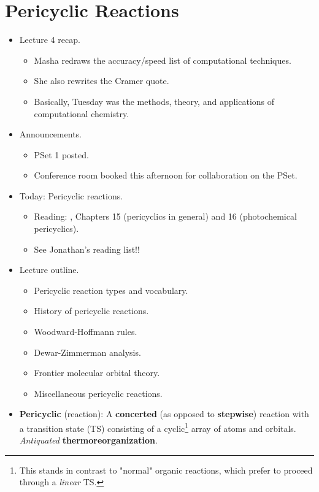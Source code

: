 \documentclass[../notes.tex]{subfiles}
\begin{document}
\section{Pericyclic Reactions}
\begin{itemize}
    \item {}Lecture 4 recap.
    \begin{itemize}
        \item Masha redraws the accuracy/speed list of computational techniques.
        \item She also rewrites the Cramer quote.
        \item Basically, Tuesday was the methods, theory, and applications of computational chemistry.
    \end{itemize}
    \item Announcements.
    \begin{itemize}
        \item PSet 1 posted.
        \item Conference room booked this afternoon for collaboration on the PSet.
    \end{itemize}
    \item Today: Pericyclic reactions.
    \begin{itemize}
        \item Reading: \textcite{bib:Anslyn}, Chapters 15 (pericyclics in general) and 16 (photochemical pericyclics).
        \item See Jonathan's reading list!!
    \end{itemize}
    \item Lecture outline.
    \begin{itemize}
        \item Pericyclic reaction types and vocabulary.
        \item History of pericyclic reactions.
        \item Woodward-Hoffmann rules.
        \item Dewar-Zimmerman analysis.
        \item Frontier molecular orbital theory.
        \item Miscellaneous pericyclic reactions.
    \end{itemize}
    \item \textbf{Pericyclic} (reaction): A \textbf{concerted} (as opposed to \textbf{stepwise}) reaction with a transition state (TS) consisting of a cyclic\footnote{This stands in contrast to "normal" organic reactions, which prefer to proceed through a \emph{linear} TS.} array of atoms and orbitals. \emph{Antiquated} \textbf{thermoreorganization}.

\end{itemize}
\end{document}
